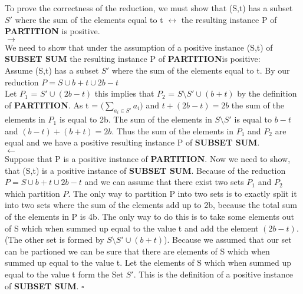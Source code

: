 \documentclass [11pt]{article}
\begin{document}
{ To prove the correctness of the reduction, we must show that (S,t) has a subset $S'$ where the sum of the elements equal to t $\leftrightarrow$ 
 the resulting instance P of \textbf{PARTITION} is positive.\\
 $\rightarrow$\\
 We need to show that under the assumption of a positive instance (S,t) of \textbf{SUBSET SUM} the resulting instance P of \textbf{PARTITION}is positive:\\
 Assume (S,t) has a subset $S'$ where the sum of the elements equal to t. By our reduction  $P = S \cup b+t \cup 2b-t$ \\
 Let $P_1$ = $S' \cup (2b-t)$ this implies that $P_2$ = $S \setminus S' \cup (b+t)$ by the definition of \textbf{PARTITION}. As t = $\big(\sum_{a_i \in S'} a_i \big) $ and $t+(2b-t)=2b$ the sum of the elements in 
 $P_1$ is equal to 2b. The sum of the elements in $S \setminus S'$ is equal to $b-t$ and  $(b-t) +(b+t) = 2b$. Thus the sum of the elements in 
 $P_1$ and $P_2$ are equal and we have a positive resulting instance P of \textbf{SUBSET SUM}.\\
 $\leftarrow$\\
 Suppose that P is a positive instance of \textbf{PARTITION}. Now we need to show, that (S,t) is a positive instance of \textbf{SUBSET SUM}.
 Because of the reduction $P = S \cup b+t \cup 2b-t$ and we can assume that there exist two sets $P_1$ and $P_2$ which partition $P$.
 The only way to partition P into two sets is to exactly split it into two sets where the sum of the elements add up to 2b, because the total sum of the elements in P is 4b.
 The only way to do this is to take some elements out of S which when summed up equal to the value t and add the element $(2b-t)$. (The other set is formed by $S \setminus S' \cup (b+t)$).
 Because we assumed that our set can be partioned we can be sure that there are elements of S which when summed up equal to the value t.
 Let the elements of S which when summed up equal to the value t form the Set $S'$. This is the definition of a positive instance of \textbf{SUBSET SUM}.
$\square$
}
\newpage
\end{document}
